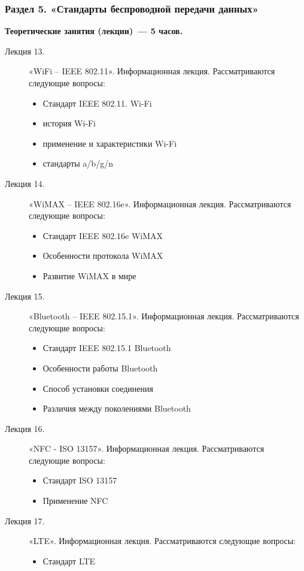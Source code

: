 \subsubsection{Раздел 5. «Стандарты беспроводной передачи данных»}

{\parindent0pt

\textbf{Теоретические занятия (лекции)~— 5 часов.}
\begin{description}
\item[Лекция 13.] «WiFi -- IEEE 802.11». Информационная лекция. Рассматриваются следующие вопросы: \begin{itemize}
\item Стандарт IEEE 802.11. Wi-Fi\item история Wi-Fi\item применение и характеристики Wi-Fi\item стандарты a/b/g/n
\end{itemize}\item[Лекция 14.] «WiMAX -- IEEE 802.16e». Информационная лекция. Рассматриваются следующие вопросы: \begin{itemize}
\item Стандарт IEEE 802.16e WiMAX\item Особенности протокола WiMAX\item Развитие WiMAX в мире
\end{itemize}\item[Лекция 15.] «Bluetooth -- IEEE 802.15.1». Информационная лекция. Рассматриваются следующие вопросы: \begin{itemize}
\item Стандарт IEEE 802.15.1 Bluetooth\item Особенности работы Bluetooth\item Способ установки соединения\item Различия между поколениями Bluetooth
\end{itemize}\item[Лекция 16.] «NFC - ISO 13157». Информационная лекция. Рассматриваются следующие вопросы: \begin{itemize}
\item Стандарт ISO 13157\item Применение NFC
\end{itemize}\item[Лекция 17.] «LTE». Информационная лекция. Рассматриваются следующие вопросы: \begin{itemize}
\item Стандарт LTE
\end{itemize}
\end{description}




}
